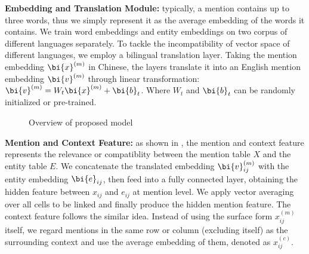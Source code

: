 \noindent
\textbf{Embedding and Translation Module:}
typically, a mention contains up to three words,
thus we simply represent it as the average embedding of the words it contains. We train word embeddings and entity embeddings on two corpus of different languages separately. 
To tackle the incompatibility of vector space of different languages, we employ a bilingual translation layer.
Taking the mention embedding $\bi{x}^{(m)}$ in Chinese,
the layers translate it into an English mention embedding $\bi{v}^{(m)}$ through linear transformation:
$\bi{v}^{(m)}=W_t \bi{x}^{(m)} + \bi{b}_t$. Where $W_t$ and $\bi{b}_t$ can be randomly initialized or pre-trained.

\begin{figure}[th]
	\centering
	\caption{Overview of proposed model}
	\label{fig:overview}
\end{figure}

\noindent
\textbf{Mention and Context Feature:}
as shown in , the mention and context feature represents the relevance or compatiblity between the mention table $X$ and the entity table $E$. We concatenate the translated embedding $\bi{v}_{ij}^{(m)}$ with the entity embedding $\bi{e}_{ij}$, then feed into a fully connected layer,
obtaining the hidden feature between $x_{ij}$ and $e_{ij}$ at mention level.
We apply vector averaging over all cells to be linked
and finally produce the hidden mention feature. 
The context feature follows the similar idea.
Instead of using the surface form $x_{ij}^{(m)}$ itself,
we regard mentions in the same row or column (excluding itself) as the surrounding context and use the average embedding of them, denoted as $x_{ij}^{(c)}$.

